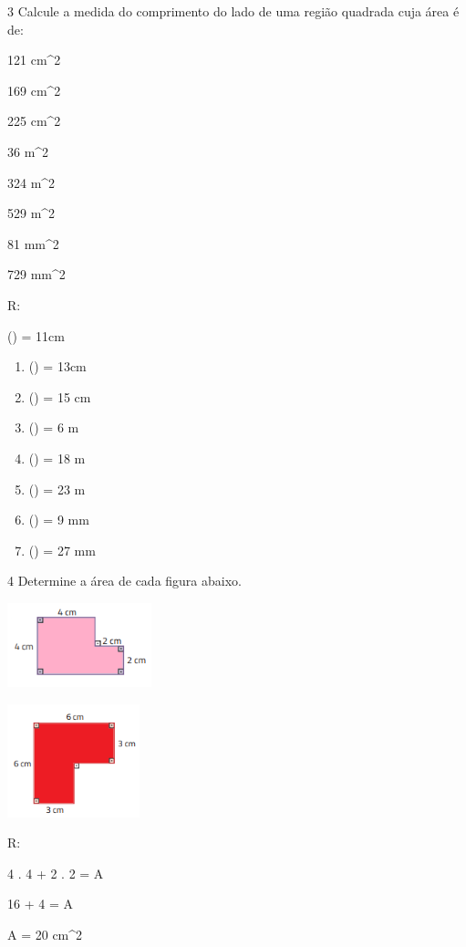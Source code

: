 {\num{3} Calcule a medida do comprimento do lado de uma região quadrada cuja
área é de:
\item 121 cm^2
\item 169 cm^2
\item 225 cm^2
\item 36 m^2
\item 324 m^2
\item 529 m^2
\item 81 mm^2
\item 729 mm^2

R:
\item () = 11cm

\begin{enumerate}
\def\labelenumi{\alph{enumi})}
\setcounter{enumi}{1}
\item
  () = 13cm
\item
  () = 15 cm
\item
  () = 6 m
\item
  () = 18 m
\item
  () = 23 m
\item
  () = 9 mm
\item
  () = 27 mm
\end{enumerate}

\num{4} Determine a área de cada figura abaixo.
\item
\includegraphics[width=1.65in,height=0.96458in]{./imgSAEB_8_MAT/media/image43.png}
\item
\includegraphics[width=1.50833in,height=1.28681in]{./imgSAEB_8_MAT/media/image44.png}

R:
\item

4 . 4 + 2 . 2 = A

16 + 4 = A

A = 20 cm^2
\item

}
